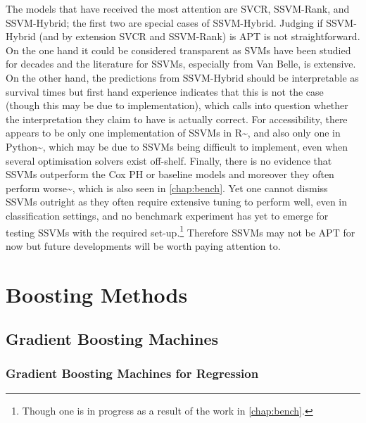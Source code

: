 \documentclass[
  letterpaper,
]{scrbook}
\theoremstyle{plain}
\theoremstyle{definition}
\theoremstyle{remark}
\begin{document}
The models that have received the most attention are SVCR, SSVM-Rank,
and SSVM-Hybrid; the first two are special cases of SSVM-Hybrid. Judging
if SSVM-Hybrid (and by extension SVCR and SSVM-Rank) is APT is not
straightforward. On the one hand it could be considered transparent as
SVMs have been studied for decades and the literature for SSVMs,
especially from Van Belle, is extensive. On the other hand, the
predictions from SSVM-Hybrid should be interpretable as survival times
but first hand experience indicates that this is not the case (though
this may be due to implementation), which calls into question whether
the interpretation they claim to have is actually correct. For
accessibility, there appears to be only one implementation of SSVMs in
\textsf{R}\textasciitilde{}\cite{pkgsurvivalsvm}, and also only one in
Python\textasciitilde{}\cite{pkgsksurvival}, which may be due to SSVMs
being difficult to implement, even when several optimisation solvers
exist off-shelf. Finally, there is no evidence that SSVMs outperform the
Cox PH or baseline models and moreover they often perform
worse\textasciitilde{}\cite{pkgsurvivalsvm, VanBelle2011b}, which is
also seen in \ref{chap:bench}. Yet one cannot dismiss SSVMs outright as
they often require extensive tuning to perform well, even in
classification settings, and no benchmark experiment has yet to emerge
for testing SSVMs with the required
set-up.\footnote{Though one is in progress as a result of the work in \ref{chap:bench}.}
Therefore SSVMs may not be APT for now but future developments will be
worth paying attention to.


\hypertarget{boosting-methods}{%
\chapter{Boosting Methods}\label{boosting-methods}}

\section{Gradient Boosting Machines}
\label{sec:surv_ml_models_boost}

\subsection{Gradient Boosting Machines for Regression}
\label{sec:surv_ml_models_boost_regr}
\end{document}
